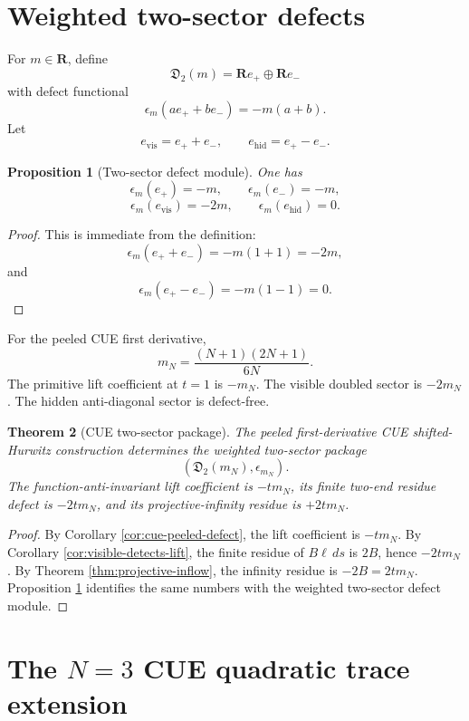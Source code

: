 \documentclass[11pt]{article}
\newcommand{\R}{\mathbf R}
\theoremstyle{plain}
\newtheorem{theorem}{Theorem}[section]
\newtheorem{proposition}[theorem]{Proposition}
\theoremstyle{definition}
\begin{document}
\section{Weighted two-sector defects}

For \(m\in\R\), define
\[
   \mathfrak D_2(m)=\R e_+\oplus\R e_-
\]
with defect functional
\[
   \epsilon_m(ae_++be_-)=-m(a+b).
\]
Let
\[
   e_{\operatorname{vis}}=e_++e_-,
   \qquad
   e_{\operatorname{hid}}=e_+-e_-.
\]

\begin{proposition}[Two-sector defect module]\label{prop:two-sector}
One has
\[
   \epsilon_m(e_+)=-m,
   \qquad
   \epsilon_m(e_-)=-m,
\]
\[
   \epsilon_m(e_{\operatorname{vis}})=-2m,
   \qquad
   \epsilon_m(e_{\operatorname{hid}})=0.
\]
\end{proposition}

\begin{proof}
This is immediate from the definition:
\[
   \epsilon_m(e_++e_-)=-m(1+1)=-2m,
\]
and
\[
   \epsilon_m(e_+-e_-)=-m(1-1)=0.
\]
\end{proof}

For the peeled CUE first derivative,
\[
   m_N=\frac{(N+1)(2N+1)}{6N}.
\]
The primitive lift coefficient at \(t=1\) is \(-m_N\).  The visible doubled sector is \(-2m_N\).  The hidden anti-diagonal sector is defect-free.

\begin{theorem}[CUE two-sector package]\label{thm:cue-two-sector}
The peeled first-derivative CUE shifted-Hurwitz construction determines the weighted two-sector package
\[
   (\mathfrak D_2(m_N),\epsilon_{m_N}).
\]
The function-anti-invariant lift coefficient is \(-tm_N\), its finite two-end residue defect is \(-2tm_N\), and its projective-infinity residue is \(+2tm_N\).
\end{theorem}

\begin{proof}
By Corollary \ref{cor:cue-peeled-defect}, the lift coefficient is \(-tm_N\).  By Corollary \ref{cor:visible-detects-lift}, the finite residue of \(B\ell\,ds\) is \(2B\), hence \(-2tm_N\).  By Theorem \ref{thm:projective-inflow}, the infinity residue is \(-2B=2tm_N\).  Proposition \ref{prop:two-sector} identifies the same numbers with the weighted two-sector defect module.
\end{proof}

\section{The \texorpdfstring{\(N=3\)}{N=3} CUE quadratic trace extension}
\end{document}
